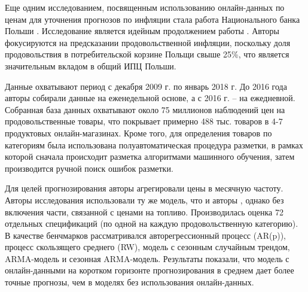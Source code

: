 Еще одним исследованием, посвященным использованию онлайн-данных по ценам для уточнения прогнозов по инфляции стала работа Национального банка Польши \cite{macias2023nowcasting}. Исследование является идейным продолжением работы \cite{aparicio2020forecasting}. Авторы фокусируются на предсказании продовольственной инфляции, поскольку доля продовольствия в потребительской корзине Польщи свыше 25\%, что является значительным вкладом в общий ИПЦ Польши.

Данные охватывают период с декабря 2009 г. по январь 2018 г. До 2016 года авторы собирали данные на еженедельной основе, а с 2016 г. – на ежедневной. Собранная база данных охватывают около 75 миллионов наблюдений цен на продовольственные товары, что покрывает примерно 488 тыс. товаров в 4-7 продуктовых онлайн-магазинах. Кроме того, для определения товаров по категориям была использована полуавтоматическая процедура разметки, в рамках которой сначала происходит разметка алгоритмами машинного обучения, затем производится ручной поиск ошибок разметки.

Для целей прогнозирования авторы агрегировали цены в месячную частоту. Авторы исследования использовали ту же модель, что и авторы \cite{aparicio2020forecasting}, однако без включения части, связанной с ценами на топливо. Производилась оценка 72 отдельных спецификаций (по одной на каждую продовольственную категорию). В качестве бенчмарков рассматривался авторегрессионный процесс (AR(p)), процесс скользящего среднего (RW), модель с сезонным случайным трендом, ARMA-модель и сезонная ARMA-модель. Результаты показали, что модель с онлайн-данными на коротком горизонте прогнозирования в среднем дает более точные прогнозы, чем в моделях без использования онлайн-данных.
